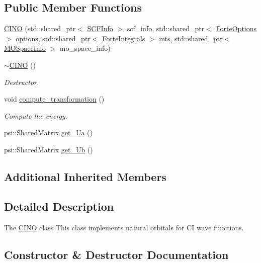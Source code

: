\subsection*{Public Member Functions}
\begin{DoxyCompactItemize}
\item 
\mbox{\hyperlink{classforte_1_1_c_i_n_o_af2ad19171a4a6ded060e0641043f0630}{C\+I\+NO}} (std\+::shared\+\_\+ptr$<$ \mbox{\hyperlink{classforte_1_1_s_c_f_info}{S\+C\+F\+Info}} $>$ scf\+\_\+info, std\+::shared\+\_\+ptr$<$ \mbox{\hyperlink{classforte_1_1_forte_options}{Forte\+Options}} $>$ options, std\+::shared\+\_\+ptr$<$ \mbox{\hyperlink{classforte_1_1_forte_integrals}{Forte\+Integrals}} $>$ ints, std\+::shared\+\_\+ptr$<$ \mbox{\hyperlink{classforte_1_1_m_o_space_info}{M\+O\+Space\+Info}} $>$ mo\+\_\+space\+\_\+info)
\item 
\mbox{\hyperlink{classforte_1_1_c_i_n_o_a0d1de460f1bb446781c9dc2fbdb0a04a}{$\sim$\+C\+I\+NO}} ()
\begin{DoxyCompactList}\small\item\em Destructor. \end{DoxyCompactList}\item 
void \mbox{\hyperlink{classforte_1_1_c_i_n_o_a8ac65e808e51c30f613cea8fcdbec851}{compute\+\_\+transformation}} ()
\begin{DoxyCompactList}\small\item\em Compute the energy. \end{DoxyCompactList}\item 
psi\+::\+Shared\+Matrix \mbox{\hyperlink{classforte_1_1_c_i_n_o_a382fe0963a51a908790fda6a7aab0e7c}{get\+\_\+\+Ua}} ()
\item 
psi\+::\+Shared\+Matrix \mbox{\hyperlink{classforte_1_1_c_i_n_o_a24b4455c4b640b7bc01b0f12b0ecb655}{get\+\_\+\+Ub}} ()
\end{DoxyCompactItemize}
\subsection*{Additional Inherited Members}


\subsection{Detailed Description}
The \mbox{\hyperlink{classforte_1_1_c_i_n_o}{C\+I\+NO}} class This class implements natural orbitals for CI wave functions. 

\subsection{Constructor \& Destructor Documentation}
\mbox{\label{classforte_1_1_c_i_n_o_af2ad19171a4a6ded060e0641043f0630}} 
